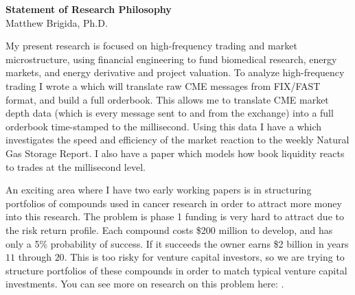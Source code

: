 \documentclass[12pt]{article}
\begin{document}
\vspace*{-3cm}
\begin{center}
{\bf Statement of Research Philosophy}\\
Matthew Brigida, Ph.D.
\end{center}
\vspace*{0.25cm}
My present research is focused on high-frequency trading and market microstructure, using financial engineering to fund biomedical research, energy markets, and energy derivative and project valuation.  To analyze high-frequency trading I wrote a \href{https://github.com/Matt-Brigida/CME-FIX-FAST-Translator}{\color{Blue}{series of scripts}} which will translate raw CME messages from FIX/FAST format, and build a full orderbook.  This allows me to translate CME market depth data (which is every message sent to and from the exchange) into a full orderbook time-stamped to the millisecond.  Using this data I have a \href{https://papers.ssrn.com/sol3/papers.cfm?abstract_id=2848527}{\color{Blue}{research paper}} which investigates the speed and efficiency of the market reaction to the weekly Natural Gas Storage Report.  I also have a paper which models how book liquidity reacts to trades at the millisecond level.

An exciting area where I have two early working papers is in structuring portfolios of compounds used in cancer research in order to attract more money into this research. The problem is phase 1 funding is very hard to attract due to the risk return profile.  Each compound costs \$200 million to develop, and has only a 5\% probability of success.  If it succeeds the owner earns \$2 billion in years $11$ through $20$.  This is too risky for venture capital investors, so we are trying to structure portfolios of these compounds in order to match typical venture capital investments.  You can see more on research on this problem here: \href{http://cancerx.mit.edu/}{\color{Blue}{http://cancerx.mit.edu/}}.
\end{document}
